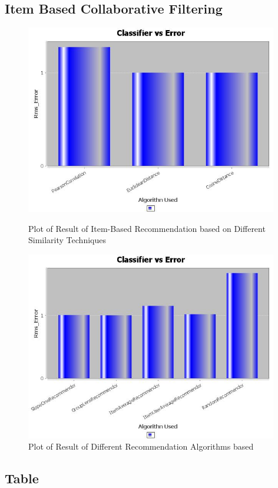 \documentclass{article}
\begin{document}
\subsection{Item Based Collaborative Filtering}
\begin{figure}[h!tb]
\centering
\includegraphics[width=11cm]{4.jpg}\\
\caption {Plot of Result of Item-Based Recommendation based on Different Similarity Techniques}
\end{figure}
\begin{figure}[h!tb]
\centering
\includegraphics[width=11cm]{5.jpg}
\caption {Plot of Result of Different Recommendation Algorithms based}
\end{figure}

\subsection{Table}
\end{document}

